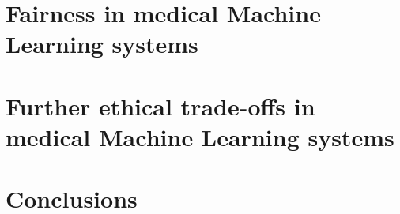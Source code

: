\documentclass[11pt,english]{article}
\begin{document}
\section{Fairness in medical Machine Learning systems}
\label{combination}


\section{Further ethical trade-offs in medical Machine Learning systems}
\label{new_tradeoff}


\section{Conclusions}
\label{conclusions}


%
\clearpage




\printbibliography
\end{document}
